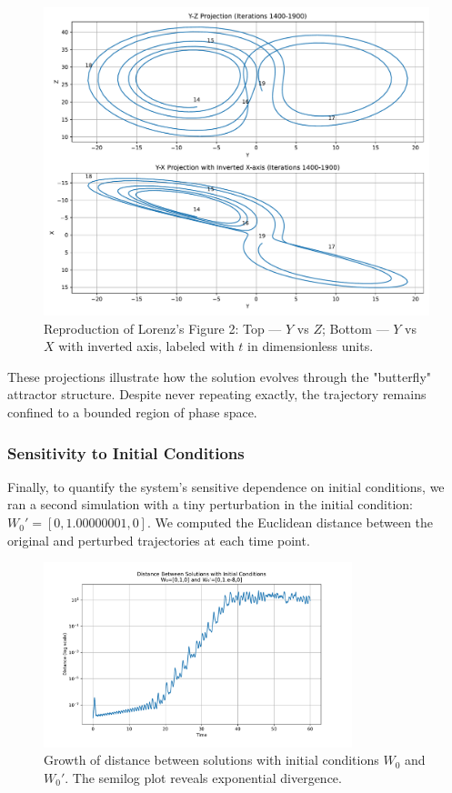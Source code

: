 \documentclass[12pt]{article}
\begin{document}
\begin{figure}[H]
    \centering
    \includegraphics[width=\textwidth]{lorenz_figure2.pdf}
    \caption{Reproduction of Lorenz's Figure 2: Top — $Y$ vs $Z$; Bottom — $Y$ vs $X$ with inverted axis, labeled with $t$ in dimensionless units.}
\end{figure}

These projections illustrate how the solution evolves through the "butterfly" attractor structure. Despite never repeating exactly, the trajectory remains confined to a bounded region of phase space.

\subsubsection*{Sensitivity to Initial Conditions}

Finally, to quantify the system's sensitive dependence on initial conditions, we ran a second simulation with a tiny perturbation in the initial condition: \( W_0' = [0, 1.00000001, 0] \). We computed the Euclidean distance between the original and perturbed trajectories at each time point.

\begin{figure}[H]
    \centering
    \includegraphics[width=0.8\textwidth]{lorenz_sensitivity.pdf}
    \caption{Growth of distance between solutions with initial conditions $W_0$ and $W_0'$. The semilog plot reveals exponential divergence.}
\end{figure}
\end{document}
